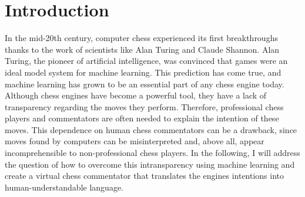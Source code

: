 \section{Introduction}

In the mid-20th century, computer chess experienced its first breakthroughs thanks to the work of scientists like Alan Turing and Claude Shannon. Alan Turing, the pioneer of artificial intelligence, was convinced that games were an ideal model system for machine learning. This prediction has come true, and machine learning has grown to be an essential part of any chess engine today. Although chess engines have become a powerful tool, they have a lack of transparency regarding the moves they perform. Therefore, professional chess players and commentators are often needed to explain the intention of these moves. This dependence on human chess commentators can be a drawback, since moves found by computers can be misinterpreted and, above all, appear incomprehensible to non-professional chess players. In the following, I will address the question of how to overcome this intransparency using machine learning and create a virtual chess commentator that translates the engines intentions into human-understandable language.